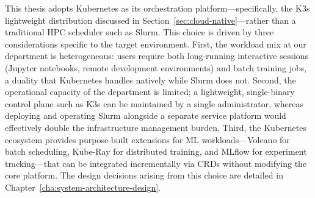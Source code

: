 This thesis adopts Kubernetes as its orchestration platform---specifically, the K3s lightweight distribution discussed in Section~\ref{sec:cloud-native}---rather than a traditional HPC scheduler such as Slurm. This choice is driven by three considerations specific to the target environment. First, the workload mix at our department is heterogeneous: users require both long-running interactive sessions (Jupyter notebooks, remote development environments) and batch training jobs, a duality that Kubernetes handles natively while Slurm does not. Second, the operational capacity of the department is limited; a lightweight, single-binary control plane such as K3s can be maintained by a single administrator, whereas deploying and operating Slurm alongside a separate service platform would effectively double the infrastructure management burden. Third, the Kubernetes ecosystem provides purpose-built extensions for ML workloads---Volcano for batch scheduling, Kube-Ray for distributed training, and MLflow for experiment tracking---that can be integrated incrementally via CRDs without modifying the core platform. The design decisions arising from this choice are detailed in Chapter~\ref{cha:system-architecture-design}.
